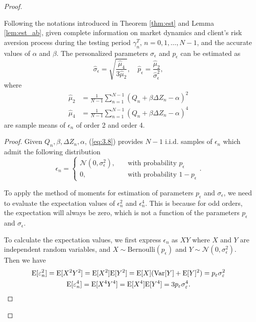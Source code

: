 \begin{proof}
\begin{lemma}\label{lem:est_eps}
    Following the notations introduced in Theorem \ref{thm:est} and Lemma \ref{lem:est_ab}, given complete information on market dynamics and client's risk aversion process during the testing period $\gamma_n^T$, $n=0,1,\ldots,N-1$, and the accurate values of $\alpha$ and $\beta$. The personalized parameters $\sigma_\epsilon$ and $p_\epsilon$ can be estimated as $$
    \hat\sigma_\epsilon=\sqrt{\frac{\hat \mu_4}{3\hat\mu_2}}, \quad \hat p_\epsilon = \frac{\hat\mu_2}{\hat\sigma_\epsilon^2},
    $$ where \begin{equation}
        \begin{aligned}
            \hat\mu_2&=\frac{1}{N-1}\sum_{n=1}^{N-1} (Q_n+\beta\Delta Z_n-\alpha)^2\\
            \hat\mu_4&=\frac{1}{N-1}\sum_{n=1}^{N-1} (Q_n+\beta\Delta Z_n-\alpha)^4
        \end{aligned}\label{eq:3.9}
    \end{equation} are sample means of $\epsilon_n$ of order 2 and order 4.
\end{lemma}
\begin{proof}
    Given $Q_n,\beta,\Delta Z_n,\alpha$, (\ref{eq:3.8}) provides $N-1$ i.i.d. samples of $\epsilon_n$ which admit the following distribution $$
        \epsilon_n=\begin{cases}
        \mathcal{N}(0,\sigma_\epsilon^2),\quad&\text{with probability } p_\epsilon\\
        0,\quad&\text{with probability } 1-p_\epsilon
        \end{cases}.
    $$

    To apply the method of moments for estimation of parameters $p_\epsilon$ and $\sigma_\epsilon$, we need to evaluate the expectation values of $\epsilon_n^2$ and $\epsilon_n^4$. This is because for odd orders, the expectation will always be zero, which is not a function of the parameters $p_\epsilon$ and $\sigma_\epsilon$.

    To calculate the expectation values, we first express $\epsilon_n$ as $XY$ where $X$ and $Y$ are independent random variables, and $X\sim\text{Bernoulli}(p_\epsilon)$ and $Y\sim\mathcal{N}(0,\sigma_\epsilon^2)$. Then we have \begin{gather*}
        \mathrm{E}[\varepsilon_n^2]=\mathrm{E}[X^2Y^2]=\mathrm{E}[X^2]\mathrm{E}[Y^2]=\mathrm{E}[X](\mathrm{Var}[Y]+\mathrm{E}[Y]^2)=p_\varepsilon\sigma_\varepsilon^2\\
        \mathrm{E}[\varepsilon_n^4]=\mathrm{E}[X^4Y^4]=\mathrm{E}[X^4]\mathrm{E}[Y^4]=3p_\varepsilon\sigma_\varepsilon^4.
    \end{gather*}
    

\end{proof}
\end{proof}
